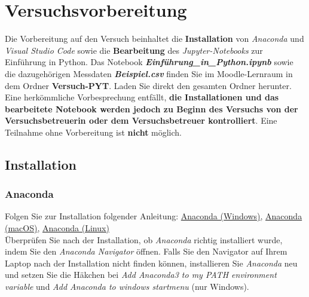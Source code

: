 \documentclass[12pt]{scrbook}
\begin{document}
\section{Versuchsvorbereitung}
\label{PY:Vorbereitung}

Die Vorbereitung auf den Versuch beinhaltet die \textbf{Installation} von \textit{Anaconda} und \textit{Visual Studio Code} sowie die \textbf{Bearbeitung} des \textit{Jupyter-Notebooks} zur Einführung in Python. Das Notebook \textbf{\textit{Einführung\_in\_Python.ipynb}} sowie die dazugehörigen Messdaten \textbf{\textit{Beispiel.csv}} finden Sie im Moodle-Lernraum in dem Ordner \textbf{Versuch-PYT}. Laden Sie direkt den gesamten Ordner herunter. Eine herkömmliche Vorbesprechung entfällt, \textbf{die Installationen und das bearbeitete Notebook werden jedoch zu Beginn des Versuchs von der Versuchsbetreuerin oder dem Versuchsbetreuer kontrolliert}. Eine Teilnahme ohne Vorbereitung ist \textbf{nicht} möglich.




\subsection{Installation}


\subsubsection{Anaconda}
\label{PY:Conda}
Folgen Sie zur Installation folgender Anleitung: \href{https://docs.anaconda.com/free/anaconda/install/windows/}{Anaconda (Windows)}, \href{https://docs.anaconda.com/free/anaconda/install/mac-os/}{Anaconda (macOS)},
\href{https://docs.anaconda.com/free/anaconda/install/linux/}{Anaconda (Linux)}\\
\newline
Überprüfen Sie nach der Installation, ob \textit{Anaconda} richtig installiert wurde, indem Sie den \textit{Anaconda Navigator} öffnen. Falls Sie den Navigator auf Ihrem Laptop nach der Installation nicht finden können, installieren Sie \textit{Anaconda} neu und setzen Sie die Häkchen bei \textit{Add Anaconda3 to my PATH environment variable} und \textit{Add Anaconda to windows startmenu} (nur Windows).
\end{document}
